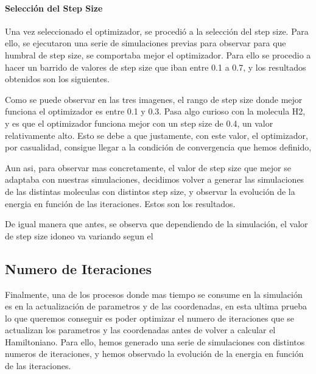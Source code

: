 \paragraph{Selección del Step Size}
Una vez seleccionado el optimizador, se procedió a la selección del step size. Para ello, se ejecutaron una serie de simulaciones previas para observar para que humbral de step size, se comportaba mejor el optimizador. Para ello se procedio a hacer un barrido de valores de step size que iban entre 0.1 a 0.7, y los resultados obtenidos son los siguientes.


Como se puede observar en las tres imagenes, el rango de step size donde mejor funciona el optimizador es entre 0.1 y 0.3. Pasa algo curioso con la molecula H2, y es que el optimizador funciona mejor con un step size de 0.4, un valor relativamente alto. Esto se debe a que justamente, con este valor, el optimizador, por casualidad, consigue llegar a la condición de convergencia que hemos definido, %

Aun asi, para observar mas concretamente, el valor de step size que mejor se adaptaba con nuestras simulaciones, decidimos volver a generar las simulaciones de las distintas moleculas con distintos step size, y observar la evolución de la energia en función de las iteraciones. Estos son los resultados.


De igual manera que antes, se observa que dependiendo de la simulación, el valor de step size idoneo va variando segun el 


\subsection{Numero de Iteraciones}

Finalmente, una de los procesos donde mas tiempo se consume en la simulación es en la actualización de parametros y de las coordenadas, en esta ultima prueba lo que queremos conseguir es poder optimizar el numero de iteraciones que se actualizan los parametros y las coordenadas antes de volver a calcular el Hamiltoniano. Para ello, hemos generado una serie de simulaciones con distintos numeros de iteraciones, y hemos observado la evolución de la energia en función de las iteraciones.
